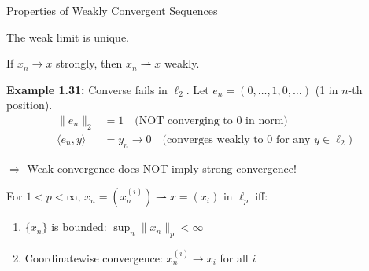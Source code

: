 \documentclass[aspectratio=169,10pt]{beamer}
\begin{document}
\begin{frame}{Properties of Weakly Convergent Sequences}
  \begin{proposition}[Proposition 1.9]
    The weak limit is unique.
  \end{proposition}

  \vspace{0.2cm}
  \begin{proposition}[Proposition 1.10]
    If $x_n \to x$ strongly, then $x_n \rightharpoonup x$ weakly.
  \end{proposition}

  \vspace{0.3cm}
  \textbf{Example 1.31:} Converse fails in $\ell_2$. Let $e_n = (0, \ldots, 1, 0, \ldots)$ (1 in $n$-th position).
  \begin{align*}
    \|e_n\|_2 &= 1 \quad \text{(NOT converging to 0 in norm)} \\
    \langle e_n, y \rangle &= y_n \to 0 \quad \text{(converges weakly to 0 for any } y \in \ell_2\text{)}
  \end{align*}

  \vspace{0.2cm}
  $\Rightarrow$ Weak convergence does NOT imply strong convergence!

  \vspace{0.3cm}
  \begin{proposition}
    For $1 < p < \infty$, $x_n = (x_n^{(i)}) \rightharpoonup x = (x_i)$ in $\ell_p$ iff:
    \begin{enumerate}
      \item $\{x_n\}$ is bounded: $\sup_n \|x_n\|_p < \infty$
      \item Coordinatewise convergence: $x_n^{(i)} \to x_i$ for all $i$
    \end{enumerate}
  \end{proposition}
\end{frame}
\end{document}
